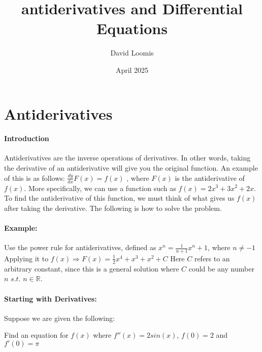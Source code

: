 \documentclass{article}
\title{antiderivatives and Differential Equations}
\author{David Loomis}
\date{April 2025}
\begin{document}
\maketitle

\section{Antiderivatives}

\paragraph{Introduction}
Antiderivatives are the inverse operations of derivatives. In other words, taking the derivative of an antiderivative will give you the original function.\newline
An example of this is as follows:\newline
$\frac{dy}{dx}F(x)=f(x)$ , where $F(x)$ is the antiderivative of $f(x)$.\newline
More specifically, we can use a function such as $f(x)=2x^3+3x^2+2x$.\newline
To find the antiderivative of this function, we must think of what gives us $f(x)$ after taking the derivative.
The following is how to solve the problem.\newline


\paragraph{Example:}

Use the power rule for antiderivatives, defined as $x^n=\frac{1}{n+1}x^n+1$, where $n\neq -1$\newline
Applying it to $f(x) \Longrightarrow F(x)=\frac{1}{2}x^4 + x^3+x^2+C$\newline
Here $C$ refers to an arbitrary constant, since this is a general solution where $C$ could be any number $n$ $s.t.$ 
$n\in\mathbb{R}$.\newline

\paragraph{Starting with Derivatives:}
\newline 

Suppose we are given the following:\newline

Find an equation for $f(x)$ where $f''(x)=2sin(x)$, $f(0)=2$ and $f'(0)= \pi$\newline
\end{document}
